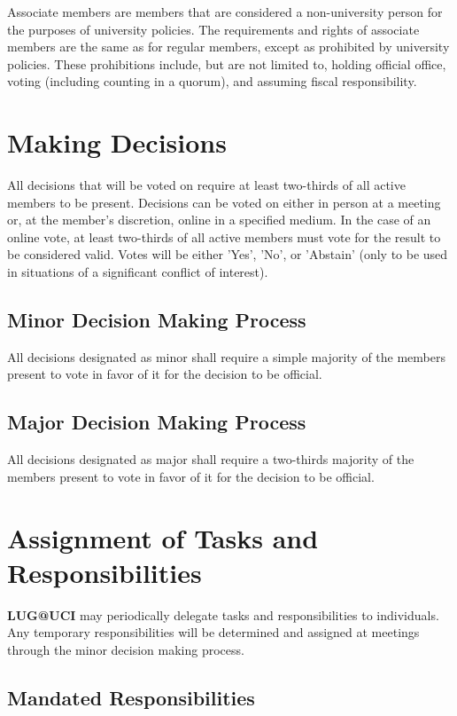 \documentclass{article}
\begin{document}
Associate members are members that are considered a non-university person for 
the purposes of university policies.  The requirements and rights of associate 
members are the same as for regular members, except as prohibited by university 
policies. These prohibitions include, but are not limited to, holding official 
office, voting (including counting in a quorum), and assuming fiscal 
responsibility.

\section{Making Decisions}

All decisions that will be voted on require at least two-thirds of all active 
members to be present. Decisions can be voted on either in person at a meeting 
or, at the member's discretion, online in a specified medium. In the case of an 
online vote, at least two-thirds of all active members must vote for the result 
to be considered valid. Votes will be either 'Yes', 'No', or 'Abstain' (only to 
be used in situations of a significant conflict of interest).

\subsection{Minor Decision Making Process}

All decisions designated as minor shall require a simple majority of the members 
present to vote in favor of it for the decision to be official.

\subsection{Major Decision Making Process}

All decisions designated as major shall require a two-thirds majority of the 
members present to vote in favor of it for the decision to be official.

\section{Assignment of Tasks and Responsibilities}

\textbf{LUG@UCI} may periodically delegate tasks and responsibilities to 
individuals.  Any temporary responsibilities will be determined and assigned at 
meetings through the minor decision making process.

\subsection{Mandated Responsibilities}
\end{document}
